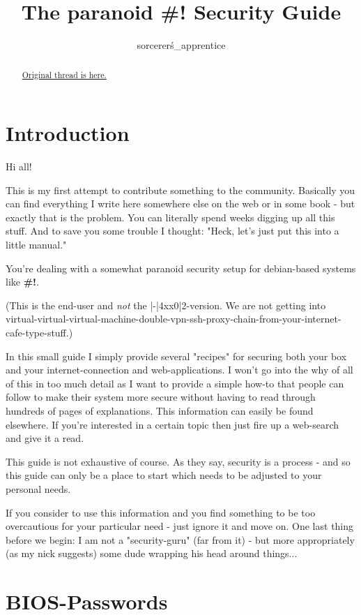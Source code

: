 \documentclass{article}
\title{The paranoid #! Security Guide}
\author{sorcerer\'s\_apprentice}
\begin{document}
\maketitle
\begin{abstract}
 \href{http://crunchbang.org/forums/viewtopic.php?id=24722}{Original thread is here.}
\end{abstract}


\tableofcontents
\section{Introduction}

 Hi all!


 This is my first attempt to contribute something to the community. Basically you can find everything I write here somewhere else on the web or in some book - but exactly that is the problem. You can literally spend weeks digging up all this stuff. And to save you some trouble I thought: "Heck, let's just put this into a little manual."


 You're dealing with a somewhat paranoid security setup for debian-based systems like \textbf{\#!}. 

(This is the end-user and \emph{not} the |-|4xx0|2-version. We are not getting into virtual-virtual-virtual-machine-double-vpn-ssh-proxy-chain-from-your-internet-cafe-type-stuff.)


 In this small guide I simply provide several "recipes" for securing both your box and your internet-connection and web-applications. I won't go into the why of all of this in too much detail as I want to provide a simple how-to that people can follow to make their system more secure without having to read through hundreds of pages of explanations. This information can easily be found elsewhere. If you're interested in a certain topic then just fire up a web-search and give it a read. 


 This guide is not exhaustive of course. As they say, security is a process - and so this guide can only be a place to start which needs to be adjusted to your personal needs. 


 If you consider to use this information and you find something to be too overcautious for your particular need - just ignore it and move on. One last thing before we begin: I am not a "security-guru" (far from it) - but more appropriately (as my nick suggests) some dude wrapping his head around things... 
\section{BIOS-Passwords}
\end{document}
